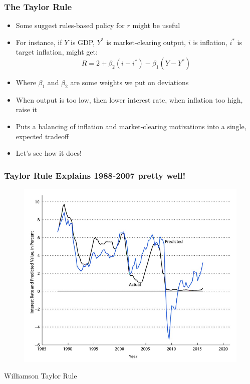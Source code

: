 \documentclass{beamer}
\begin{document}
\begin{frame}
\frametitle[alignment=center]{The Taylor Rule}
\begin{itemize}
\item Some suggest rules-based policy for $r$ might be useful
\bigskip
\item For instance, if $Y$ is GDP, $Y^*$ is market-clearing output, $i$ is inflation, $i^*$ is target inflation, might get:
$$R=2+\beta_2(i-i^*)-\beta_1(Y-Y^*)$$
\item Where $\beta_1$ and $\beta_2$ are some weights we put on deviations 
\bigskip
\item When output is too low, then lower interest rate, when inflation too high, raise it
\bigskip
\item Puts a balancing of inflation and market-clearing motivations into a single, expected tradeoff
\bigskip
\item Let's see how it does!
\end{itemize}
\end{frame}



\begin{frame}
\frametitle[alignment=center]{Taylor Rule Explains 1988-2007 pretty well!}
\begin{figure}
\centering
\includegraphics[scale=0.65]{Figures/W_Fig_14pt7.png}
\end{figure}
Williamson Taylor Rule
\end{frame}
\end{document}
